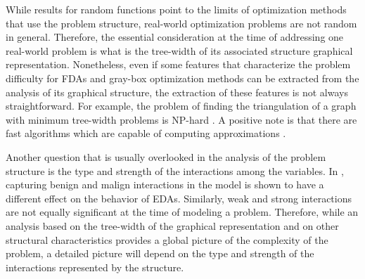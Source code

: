\documentclass{article} %
\begin{document}
 While results for random functions point to the limits of optimization methods that use the problem structure, real-world optimization problems are not random in general. Therefore, the essential consideration at the time of addressing one real-world problem is what is the tree-width of its associated structure graphical representation.  Nonetheless, even if some features that characterize the problem difficulty for FDAs and gray-box optimization methods can be extracted from the analysis of its graphical structure, the extraction of these features is not always straightforward. For example, the problem of finding the triangulation of a graph with minimum tree-width problems is NP-hard \cite{Yannakakis:1981}. A positive note is that there are fast algorithms which are capable of computing approximations \cite{Heggernes:2006,Tarjan_and_Yannakakis:1984}.

 Another question that is usually overlooked in the analysis of the problem structure is the type and strength of the interactions among the variables.  In \cite{Santana_et_al:2005b}, capturing benign and malign interactions \cite{Kallel_et_al:2000} in the model is shown to have a different effect on the behavior of EDAs.  Similarly, weak and strong interactions are not equally significant at the time of modeling a problem. Therefore, while an analysis based on the tree-width of the graphical representation  and on other structural characteristics provides a global picture of the complexity of the problem, a detailed picture will depend on the type and strength of the interactions represented by the structure.  



\end{document}
